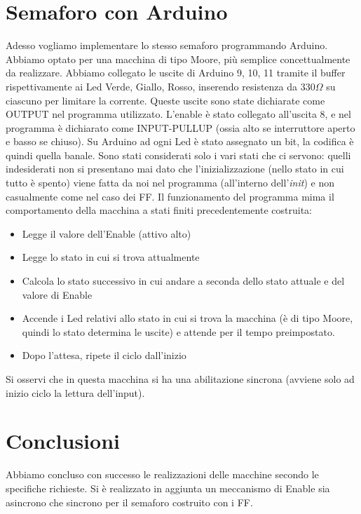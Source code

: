 \documentclass[10pt,a4paper]{article}
\begin{document}
\section{Semaforo con Arduino}
Adesso vogliamo implementare lo stesso semaforo programmando Arduino. Abbiamo optato per una macchina di tipo Moore, più semplice concettualmente da realizzare.
Abbiamo collegato le uscite di Arduino 9, 10, 11 tramite il buffer rispettivamente ai Led Verde, Giallo, Rosso, inserendo resistenza da $330\Omega$ su ciascuno per limitare la corrente.
Queste uscite sono state dichiarate come OUTPUT nel programma utilizzato.
L'enable è stato collegato all'uscita 8, e nel programma è dichiarato come INPUT-PULLUP (ossia alto se interruttore aperto e basso se chiuso).
Su Arduino ad ogni Led è stato assegnato un bit, la codifica è quindi quella banale. Sono stati considerati solo i vari stati che ci servono: quelli indesiderati non si presentano mai dato che l'inizializzazione (nello stato in cui tutto è spento) viene fatta da noi nel programma (all'interno dell'\emph{init}) e non casualmente come nel caso dei FF.
Il funzionamento del programma mima il comportamento della macchina a stati finiti precedentemente costruita:
\begin{itemize}
\item Legge il valore dell'Enable (attivo alto)
\item Legge lo stato in cui si trova attualmente
\item Calcola lo stato successivo in cui andare a seconda dello stato attuale e del valore di Enable
\item Accende i Led relativi allo stato in cui si trova la macchina (è di tipo Moore, quindi lo stato determina le uscite) e attende per il tempo preimpostato.
\item Dopo l'attesa, ripete il ciclo dall'inizio
\end{itemize}
Si osservi che in questa macchina si ha una abilitazione sincrona (avviene solo ad inizio ciclo la lettura dell'input).

\section{Conclusioni}
Abbiamo concluso con successo le realizzazioni delle macchine secondo le specifiche richieste. Si è realizzato in aggiunta un meccanismo di Enable sia asincrono che sincrono per il semaforo costruito con i FF.
\end{document}
